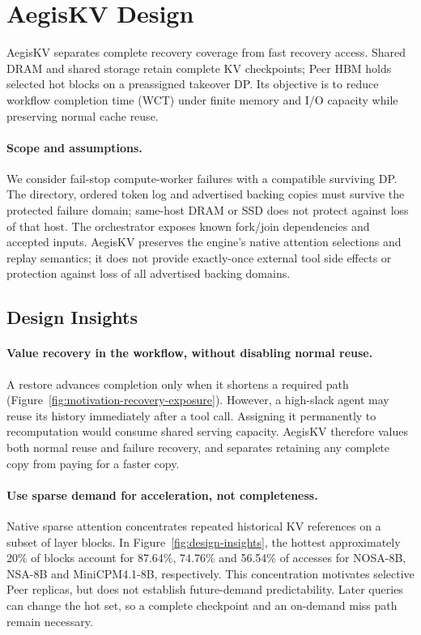 \section{AegisKV Design}
\label{sec:design}

AegisKV separates complete recovery coverage from fast recovery access.
Shared DRAM and shared storage retain complete KV checkpoints; Peer HBM
holds selected hot blocks on a preassigned takeover DP. Its objective is
to reduce workflow completion time (WCT) under finite memory and I/O
capacity while preserving normal cache reuse.

\paragraph{Scope and assumptions.}
We consider fail-stop compute-worker failures with a compatible surviving
DP. The directory, ordered token log and advertised backing copies must
survive the protected failure domain; same-host DRAM or SSD does not
protect against loss of that host. The orchestrator exposes known
fork/join dependencies and accepted inputs. AegisKV preserves the engine's
native attention selections and replay semantics; it does not provide
exactly-once external tool side effects or protection against loss of all
advertised backing domains.

\subsection{Design Insights}
\label{sec:design-insights}

\paragraph{Value recovery in the workflow, without disabling normal reuse.}
A restore advances completion only when it shortens a required path
(Figure~\ref{fig:motivation-recovery-exposure}). However, a high-slack
agent may reuse its history immediately after a tool call. Assigning it
permanently to recomputation would consume shared serving capacity.
AegisKV therefore values both normal reuse and failure recovery, and
separates retaining any complete copy from paying for a faster copy.

\paragraph{Use sparse demand for acceleration, not completeness.}
Native sparse attention concentrates repeated historical KV references
on a subset of layer blocks. In Figure~\ref{fig:design-insights}, the
hottest approximately 20\% of blocks account for 87.64\%, 74.76\% and
56.54\% of accesses for NOSA-8B, NSA-8B and MiniCPM4.1-8B, respectively.
This concentration motivates selective Peer replicas, but does not
establish future-demand predictability. Later queries can change the
hot set, so a complete checkpoint and an on-demand miss path remain
necessary.

